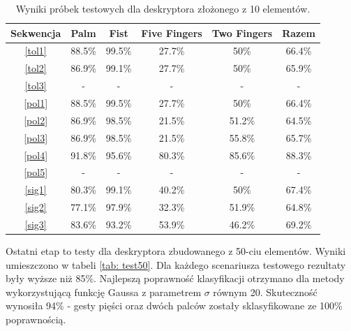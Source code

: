 \begin{table} [h!]
	\centering
	\begin{tabular}{|c|c|c|c|c|c|}
		\hline
		\textbf{Sekwencja} 	& \textbf{Palm} & \textbf{Fist} & \textbf{Five Fingers} & \textbf{Two Fingers} & \textbf{Razem} \\ \hline
		\ref{tol1} 	& 88.5\% 	& 99.5\%	& 27.7\%	& 50\% 		& 66.4\% \\ \hline
		\ref{tol2} 	& 86.9\% 	& 99.1\%	& 27.7\%	& 50\% 		& 65.9\% \\ \hline
		\ref{tol3}	& -			& -			& -			& - 		& - 	 \\ \hline \hline
		\ref{pol1} 	& 88.5\% 	& 99.5\%	& 27.7\%	& 50\% 		& 66.4\% \\ \hline
		\ref{pol2} 	& 86.9\% 	& 98.5\%	& 21.5\%	& 51.2\% 	& 64.5\% \\ \hline
		\ref{pol3}	& 86.9\%	& 98.5\%	& 21.5\%	& 55.8\% 	& 65.7\% \\ \hline
		\ref{pol4}	& 91.8\%	& 95.6\%	& 80.3\%	& 85.6\% 	& 88.3\% \\ \hline
		\ref{pol5}	& -			& -			& -			& - 		& - 	 \\ \hline \hline
		\ref{sig1}	& 80.3\% 	& 99.1\%	& 40.2\%	& 50\% 		& 67.4\% \\ \hline
		\ref{sig2}	& 77.1\% 	& 97.9\%	& 32.3\%	& 51.9\% 	& 64.8\% \\ \hline
		\ref{sig3}	& 83.6\%	& 93.2\%	& 53.9\%	& 46.2\% 	& 69.2\% \\ \hline
	\end{tabular}
	\caption{Wyniki próbek testowych dla deskryptora złożonego z 10 elementów.}
	\label{tab: test10}
\end{table}

Ostatni etap to testy dla deskryptora zbudowanego z 50-ciu elementów. Wyniki umieszczono w tabeli \ref{tab: test50}. Dla każdego scenariusza testowego rezultaty były wyższe niż 85\%. Najlepszą poprawność klasyfikacji  otrzymano dla metody wykorzystującą funkcję Gaussa z parametrem $\sigma$ równym 20. Skuteczność wynosiła 94\% - gesty pięści oraz dwóch palców zostały sklasyfikowane ze 100\% poprawnością. 

